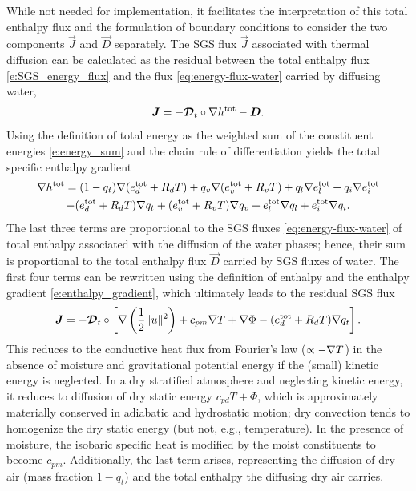 \documentclass{report}
\begin{document}
While not needed for implementation, it facilitates the interpretation of this total enthalpy flux and the formulation of boundary conditions to consider the two components $\vec{J}$ and $\vec{D}$ separately. The SGS flux $\vec{J}$ associated with thermal diffusion can be calculated as the residual between the total enthalpy flux \eqref{e:SGS_energy_flux} and the flux \eqref{eq:energy-flux-water} carried by diffusing water, 
\[
    \boldsymbol{{J}} = - \boldsymbol{{\mathcal{D}}}_t \circ \nabla h^{\mathrm{tot}} - \boldsymbol{{D}}.
\]
Using the definition of total energy as the weighted sum of the constituent energies \eqref{e:energy_sum} and the chain rule of differentiation yields the total specific enthalpy gradient
\begin{multline*}
\nabla h^{\mathrm{tot}}
= (1-q_t)\nabla (e_d^{\mathrm{tot}} + R_d T) + q_v \nabla (e_v^{\mathrm{tot}} + R_v T) + q_l \nabla e_l^{\mathrm{tot}} + q_i \nabla e_i^{\mathrm{tot}} \\
- (e_d^{\mathrm{tot}} + R_d T) \nabla q_t + (e_v^{\mathrm{tot}} + R_v T) \nabla q_v + e_l^{\mathrm{tot}}\nabla q_l + e_i^{\mathrm{tot}} \nabla q_i.
\end{multline*}
The last three terms are proportional to the SGS fluxes \eqref{eq:energy-flux-water} of total enthalpy associated with the diffusion of the water phases; hence, their sum is proportional to the total enthalpy flux $\vec{D}$ carried by SGS fluxes of water. The first four terms can be rewritten using the definition of enthalpy and the enthalpy gradient \eqref{e:enthalpy_gradient}, which ultimately leads to the residual SGS flux
\begin{equation}\label{e:sgs_heat_flux}
\boldsymbol{{J}} = - \boldsymbol{{\mathcal{D}}}_t \circ \left[ \nabla \left( \frac{1}{2} \| u \|^2 \right) + c_{pm} \nabla T + \nabla \Phi - (e_d^{\mathrm{tot}} + R_d T) \nabla q_t \right].
\end{equation}
This reduces to the conductive heat flux from Fourier's law ($\propto -\nabla T$) in the absence of moisture and gravitational potential energy if the (small) kinetic energy is neglected. In a dry stratified atmosphere and neglecting kinetic energy, it reduces to diffusion of dry static energy $c_{pd} T + \Phi$, which is approximately materially conserved in adiabatic and hydrostatic motion; dry convection tends to homogenize the dry static energy (but not, e.g., temperature). In the presence of moisture, the isobaric specific heat is modified by the moist constituents to become $c_{pm}$. Additionally, the last term arises, representing the diffusion of dry air (mass fraction $1-q_t$) and the total enthalpy the diffusing dry air carries.
\end{document}
